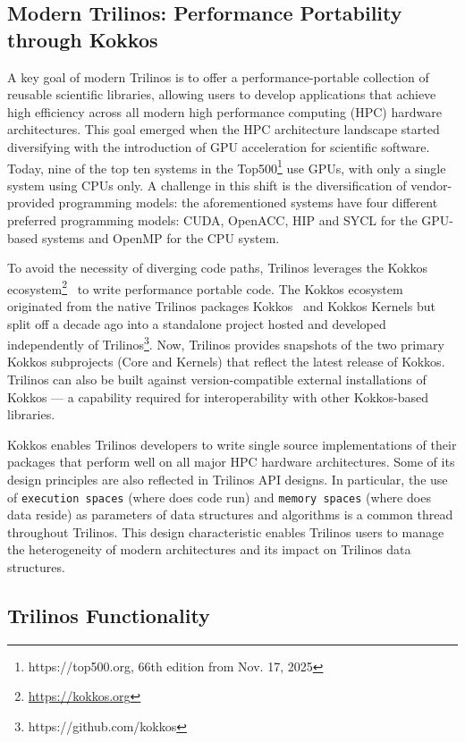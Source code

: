 \subsection{Modern Trilinos:  Performance Portability through Kokkos}


A key goal of modern Trilinos is to offer a performance\hyp{}portable collection of reusable scientific libraries, allowing users to develop applications that achieve high efficiency across all modern high performance computing (HPC) hardware architectures.
This goal emerged when the HPC architecture landscape started diversifying with the
introduction of GPU acceleration for scientific software. Today, nine of the top ten systems in the Top500\footnote{https://top500.org, 66th edition from Nov. 17, 2025} use GPUs, with only a single system using CPUs only. A challenge in this shift is the diversification of vendor-provided programming models: the aforementioned systems have four different preferred programming models: CUDA, OpenACC, HIP and SYCL for the GPU-based systems and OpenMP for the CPU system.

To avoid the necessity of diverging code paths, Trilinos leverages the Kokkos ecosystem\footnote{\url{https://kokkos.org}}~\cite{trott2021kokkos} to write performance portable code. The Kokkos ecosystem originated from the native Trilinos packages Kokkos~\cite{heroux2011toward} and Kokkos Kernels but split off a decade ago into a standalone project hosted and developed independently of Trilinos\footnote{https://github.com/kokkos}.
Now, Trilinos provides snapshots of the two primary Kokkos subprojects (Core and Kernels) that reflect the latest release of Kokkos. Trilinos can also be built against version-compatible external installations of Kokkos --- a capability required for interoperability with other Kokkos-based libraries.

Kokkos enables Trilinos developers to write single source implementations of their packages that perform well on all major HPC hardware architectures. Some of its design principles are also reflected in Trilinos API designs. In particular, the use of \texttt{execution spaces} (where does code run) and \texttt{memory spaces} (where does data reside) as parameters of data structures and algorithms is a common thread throughout Trilinos. This design characteristic enables Trilinos users to manage the heterogeneity of modern architectures and its impact on Trilinos data structures.


\subsection{Trilinos Functionality}

